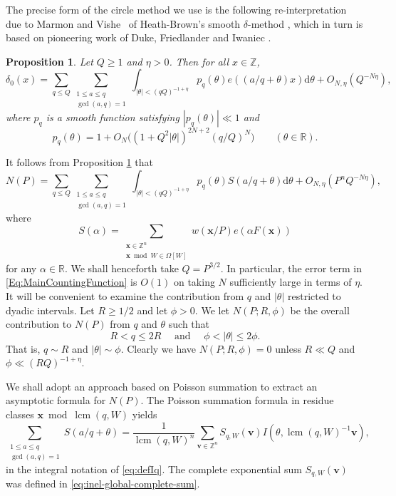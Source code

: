 \documentclass[a4paper,11pt, twoside,reqno]{amsart}
\theoremstyle{plain}
\newtheorem{prop}[thm]{Proposition}
\theoremstyle{definition}
\theoremstyle{remark}
\newcommand{\bfv}{\bm{v}}
\newcommand{\bfx}{\bm{x}}
\newcommand{\ZZ}{\mathbb{Z}}
\newcommand{\RR}{\mathbb{R}}
\newcommand{\dd}{\mathrm{d}}
\renewcommand{\leq}{\leqslant}
\renewcommand{\geq}{\geqslant}
\newcommand{\lcm}{\operatorname{lcm}}
\numberwithin{equation}{section}
\begin{document}
The precise form of the circle method we use is the following re-interpretation due to Marmon and Vishe~\cite[Proposition~1.2 and Lemma~2.2]{MV19} of Heath-Brown's smooth $\delta$-method \cite{HB}, which in turn is based on pioneering work of Duke, Friedlander and Iwaniec \cite{DFI}.

\begin{prop}\label{p:MV}
Let $Q\geq 1$ and $\eta>0$. Then for all $x\in\ZZ$,
\[
\delta_0(x)=\sum_{q\leq Q}
\sum_{\substack{1\leq a \leq q \\ \gcd(a,q)=1}}
\int_{|\theta|<(qQ)^{-1+\eta}}
p_q(\theta)e((a/q+\theta)x)\dd\theta + O_{N,\eta}\left(Q^{-N\eta}\right),
\]
where
$p_q$ is a smooth function satisfying 
$|p_q(\theta)|\ll 1$
and
\begin{equation}\label{eq:MV-kernel-estimate}
 p_q(\theta)=1+O_N\bigl((1+Q^2|\theta|)^{2N+2}(q/Q)^N\bigr)
 \qquad(\theta\in\RR).
\end{equation}
\end{prop}

It follows from Proposition \ref{p:MV} that 
\begin{equation}\label{Eq:MainCountingFunction}
N(P)=\sum_{q\leq Q}
\sum_{\substack{1\leq a \leq q \\ \gcd(a,q)=1}}
\int_{|\theta|<(qQ)^{-1+\eta}}p_q(\theta)S(a/q+\theta)\dd\theta +O_{N,\eta }(P^nQ^{-N\eta}),
\end{equation}
where 
\[
S(\alpha)=\sum_{\substack{\bm{x}\in \ZZ^n\\\bm{x}\bmod W\in\Omega[W]}}w(\bm{x}/P)e(\alpha F(\bm{x}))
\]
for any $\alpha \in \RR$.  
We shall henceforth take $Q=P^{3/2}$.
In particular, the error term in 
\eqref{Eq:MainCountingFunction} is $O(1)$ on taking $N$ sufficiently large in terms of $\eta$.
It will be convenient to examine the contribution from $q$ and $|\theta|$ restricted to 
dyadic intervals. 
Let $R\geq 1/2$ and let $\phi>0$. We let $N(P;R,\phi)$ be the overall contribution to 
$N(P)$
from $q$ and $\theta$ such that 
$$
R< q\leq 2R \quad \text{ and } \quad \phi<|\theta|\leq 2\phi.
$$
That is, $q\sim R$ and $|\theta|\sim \phi$.
Clearly we have $N(P;R,\phi)=0$ unless $R\ll Q$ and $\phi \ll (RQ)^{-1+\eta}$.

We shall adopt an approach based on Poisson summation to extract an asymptotic formula
for $N(P)$. 
The Poisson summation formula
in residue classes $\bfx \bmod \lcm(q,W)$
yields
\[
\sum_{\substack{1\leq a \leq q \\ \gcd(a,q)=1}}
S(a/q+\theta)
=\frac{1}{\lcm(q,W)^n}
\sum_{\bm{v}\in \ZZ^n}S_{q,W}(\bm{v})I(\theta,\lcm(q,W)^{-1}\bm{v}),
\]
in the integral notation of \eqref{eq:defIq}.
The complete exponential sum $S_{q,W}(\bfv)$
was defined in \eqref{eq:inel-global-complete-sum}.
\end{document}
